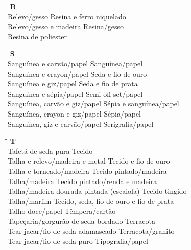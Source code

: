 \begin{tabbing}
	\hspace{8,7cm}\=\hspace{1cm}\=\kill
	\textbf{R} \>  \\ 
	Relevo/gesso	\> Resina e ferro niquelado\\
	Relevo/gesso e madeira \> Resina/gesso\\
	Resina de poliester \>  \\	
\end{tabbing}

\begin{tabbing}
	\hspace{8,7cm}\=\hspace{1cm}\=\kill
	\textbf{S} \>  \\ 
	Sanguínea e carvão/papel	\> Sanguínea/papel\\
	Sanguínea e crayon/papel \> Seda e fio de ouro\\
	Sanguínea e giz/papel	\> Seda e fio de prata\\
	Sanguínea e sépia/papel \> Semi off-set/papel\\
	Sanguínea, carvão e giz/papel	\> Sépia e sanguínea/papel\\
	Sanguínea, crayon e giz/papel \> Sépia/papel\\
	Sanguínea, giz e carvão/papel \> Serigrafia/papel\\
\end{tabbing}

\begin{tabbing}
	\hspace{8,7cm}\=\hspace{1cm}\=\kill
	\textbf{T} \>  \\ 
	Tafetá de seda pura	\> Tecido\\
	Talha e relevo/madeira e metal \> Tecido e fio de ouro\\
	Talha e torneado/madeira	\> Tecido pintado/madeira\\
	Talha/madeira \> Tecido pintado/renda e madeira\\
	Talha/madeira dourada pintada (escaiola)	\> Tecido tingido\\
	Talha/marfim \> Tecido, seda, fio de ouro e fio de prata\\
	Talho doce/papel \> Têmpera/cartão\\
	Tapeçaria/gorgurão de seda bordado	\> Terracota\\
	Tear jacar/fio de seda adamascado \> Terracota/granito\\
	Tear jacar/fio de seda puro \> Tipografia/papel\\
\end{tabbing}

